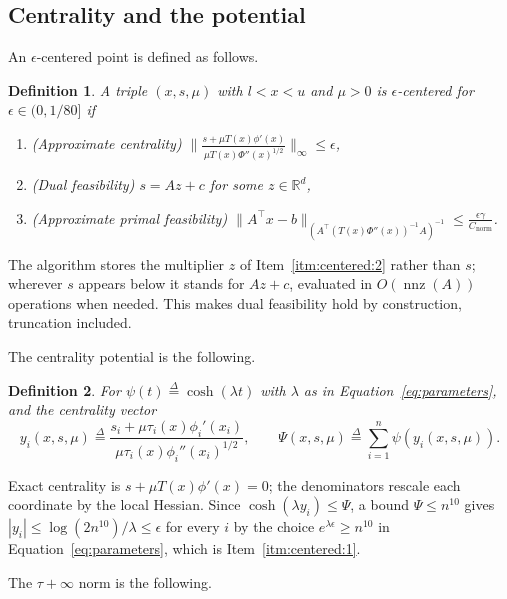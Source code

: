 \documentclass[11pt]{article}
\newtheorem{definition}{Definition}[section]
\newcommand{\R}{\mathbb R}
\newcommand{\nnz}{\operatorname{nnz}}
\newcommand{\defeq}{\stackrel{\Delta}{=}}
\newcommand{\Cnorm}{C_{\mathrm{norm}}}
\begin{document}
\subsection{Centrality and the potential}

An $\epsilon$-centered point is defined as follows.

\begin{definition}
\label{def:centered}
A triple $(x, s, \mu)$ with
$l < x < u$ and
$\mu > 0$ is
$\epsilon$-centered for
$\epsilon \in (0, 1/80]$ if
\begin{enumerate}
\item \label{itm:centered:1} (Approximate centrality)
  $\displaystyle \| \frac{s + \mu T(x) \phi'(x)}{\mu T(x) \Phi''(x)^{1/2}} \|_{\infty} \le \epsilon$,
\item \label{itm:centered:2} (Dual feasibility) $s = A z + c$ for some
  $z \in \R^{d}$,
\item \label{itm:centered:3} (Approximate primal feasibility)
  $\displaystyle \| A^\top x - b \| _{( A^\top (T(x) \Phi''(x))^{-1} A )^{-1}} \le \frac{\epsilon \gamma}{\Cnorm}$.
\end{enumerate}
\end{definition}

The algorithm stores the multiplier $z$ of Item~\ref{itm:centered:2} rather than
$s$; wherever
$s$ appears below it stands for
$A z + c$, evaluated in
$O(\nnz(A))$ operations when needed.
This makes dual feasibility hold by construction, truncation included.

The centrality potential is the following.

\begin{definition}
\label{def:potential}
For $\psi(t) \defeq \cosh(\lambda t)$ with
$\lambda$ as in Equation~\eqref{eq:parameters}, and the centrality vector
\[
y_i(x, s, \mu)
\defeq
\frac{s_i + \mu \tau_i(x) \phi_i'(x_i)}
{\mu \tau_i(x) \phi_i''(x_i)^{1/2}},
\qquad
\Psi(x, s, \mu)
\defeq
\sum_{i = 1}^{n}
\psi\left( y_i(x, s, \mu) \right).
\]
\end{definition}

Exact centrality is $s + \mu T(x) \phi'(x) = 0$; the denominators rescale each
coordinate by the local Hessian.
Since $\cosh(\lambda y_i) \le \Psi$, a bound
$\Psi \le n^{10}$ gives
$|y_i| \le \log(2 n^{10}) / \lambda \le \epsilon$ for every
$i$ by the choice
$e^{\lambda \epsilon} \ge n^{10}$ in Equation~\eqref{eq:parameters}, which is
Item~\ref{itm:centered:1}.

The $\tau + \infty$ norm is the following.
\end{document}
